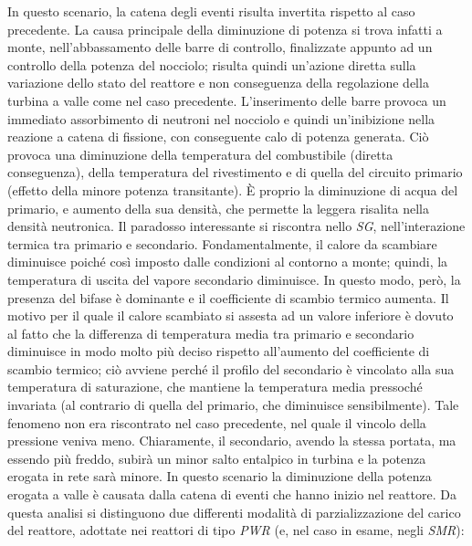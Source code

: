 \documentclass[12pt]{report}
\begin{document}
In questo scenario, la catena degli eventi risulta invertita rispetto al caso precedente. La causa principale della diminuzione di potenza si trova infatti a monte, nell’abbassamento delle barre di controllo, finalizzate appunto ad un controllo della potenza del nocciolo; risulta quindi un’azione diretta sulla variazione dello stato del reattore e non conseguenza della regolazione della turbina a valle come nel caso precedente.
L’inserimento delle barre provoca un immediato assorbimento di neutroni nel nocciolo e quindi un'inibizione nella reazione a catena di fissione, con conseguente calo di potenza generata.  Ciò provoca una diminuzione della temperatura del combustibile (diretta conseguenza), della temperatura del rivestimento e di quella del circuito primario (effetto della minore potenza transitante). È proprio la diminuzione di acqua del primario, e aumento della sua densità, che permette la leggera risalita nella densità neutronica.
Il paradosso interessante si riscontra nello \textit{SG}, nell’interazione termica tra primario e secondario. Fondamentalmente, il calore da scambiare diminuisce poiché così imposto dalle condizioni al contorno a monte; quindi, la temperatura di uscita del vapore secondario diminuisce. In questo modo, però, la presenza del bifase è dominante e il coefficiente di scambio termico aumenta. Il motivo per il quale il calore scambiato si assesta ad un valore inferiore è dovuto al fatto che la differenza di temperatura media tra primario e secondario diminuisce in modo molto più deciso rispetto all’aumento del coefficiente di scambio termico; ciò avviene perché il profilo del secondario è vincolato alla sua temperatura di saturazione, che mantiene la temperatura media pressoché invariata (al contrario di quella del primario, che diminuisce sensibilmente). Tale fenomeno non era riscontrato nel caso precedente, nel quale il vincolo della pressione veniva meno.
Chiaramente, il secondario, avendo la stessa portata, ma essendo più freddo, subirà un minor salto entalpico in turbina e la potenza erogata in rete sarà minore. 
In questo scenario la diminuzione della potenza erogata a valle è causata dalla catena di eventi che hanno inizio nel reattore.
Da questa analisi si distinguono due differenti modalità di parzializzazione del carico del reattore, adottate nei reattori di tipo \textit{PWR} (e, nel caso in esame, negli \textit{SMR}):
\end{document}
